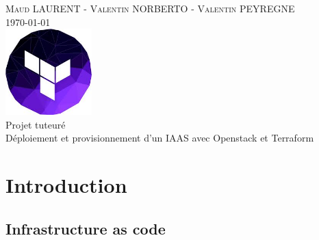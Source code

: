 \documentclass[]{article}
\date{}
\begin{document}
\makeatletter
\begin{titlepage}
\centering
\textsc{Maud LAURENT - Valentin NORBERTO - Valentin PEYREGNE}\\
\vspace{1cm}
\textsc{\today}\\
\vspace{5cm}
\includegraphics[width=0.25\textwidth]{Images/download.jpeg} \\
\vspace{1cm}
\Huge{Projet tuteuré \\ Déploiement et provisionnement d’un IAAS avec Openstack et Terraform}\\
\vfill
\end{titlepage}
\makeatother

\tableofcontents
\newpage

\section{Introduction}\label{introduction}

\subsection{Infrastructure as code}\label{infrastructure-as-code}
\end{document}
